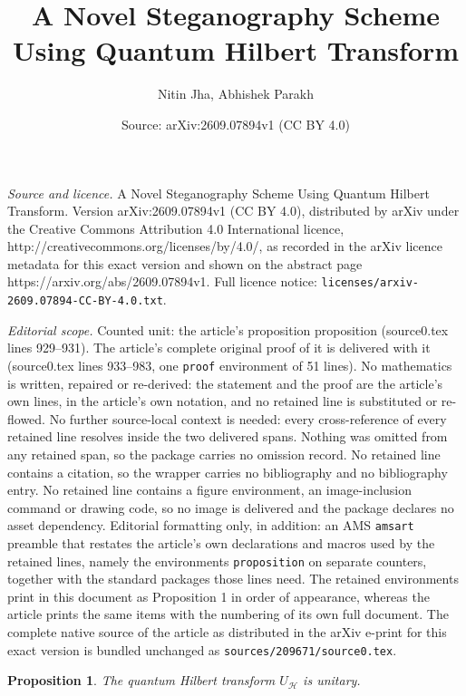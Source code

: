 \documentclass[10pt,a4paper]{amsart}
\title{A Novel Steganography Scheme Using Quantum Hilbert Transform}
\author{Nitin Jha, Abhishek Parakh}
\date{Source: arXiv:2609.07894v1 (CC BY 4.0)}
\newtheorem{proposition}{Proposition}
\begin{document}
\maketitle

\noindent\emph{Source and licence.} A Novel Steganography Scheme Using Quantum Hilbert Transform. Version arXiv:2609.07894v1 (CC BY 4.0), distributed by arXiv under the Creative Commons Attribution 4.0 International licence, http://creativecommons.org/licenses/by/4.0/, as recorded in the arXiv licence metadata for this exact version and shown on the abstract page https://arxiv.org/abs/2609.07894v1. Full licence notice: \texttt{licenses/arxiv-2609.07894-CC-BY-4.0.txt}.\par\smallskip

\noindent\textit{Editorial scope.} Counted unit: the article's proposition proposition (source0.tex lines 929--931). The article's complete original proof of it is delivered with it (source0.tex lines 933--983, one \texttt{proof} environment of 51 lines). No mathematics is written, repaired or re-derived: the statement and the proof are the article's own lines, in the article's own notation, and no retained line is substituted or re-flowed.  No further source-local context is needed: every cross-reference of every retained line resolves inside the two delivered spans.  Nothing was omitted from any retained span, so the package carries no omission record.  No retained line contains a citation, so the wrapper carries no bibliography and no bibliography entry.  No retained line contains a figure environment, an image-inclusion command or drawing code, so no image is delivered and the package declares no asset dependency.  Editorial formatting only, in addition: an AMS \texttt{amsart} preamble that restates the article's own declarations and macros used by the retained lines, namely the environments \texttt{proposition} on separate counters, together with the standard packages those lines need.  The retained environments print in this document as Proposition 1 in order of appearance, whereas the article prints the same items with the numbering of its own full document.  The complete native source of the article as distributed in the arXiv e-print for this exact version is bundled unchanged as \texttt{sources/209671/source0.tex}.
\begin{proposition}
The quantum Hilbert transform $U_{\mathcal H}$ is unitary.
\end{proposition}
\end{document}
